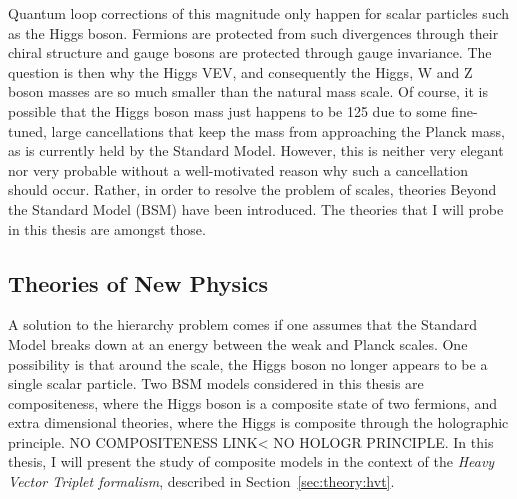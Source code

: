 Quantum loop corrections of this magnitude only happen for scalar particles such as the Higgs boson. Fermions are protected from such divergences through their chiral structure and gauge bosons are protected through gauge invariance. The question is then why the Higgs VEV, and consequently the Higgs, W and Z boson masses are so much smaller than the natural mass scale.\newline
Of course, it is possible that the Higgs boson mass just happens to be 125 \GeV due to some fine-tuned, large cancellations that keep the mass from approaching the Planck mass, as is currently held by the Standard Model. However, this is neither very elegant nor very probable without a well-motivated reason why such a cancellation should occur. Rather, in order to resolve the problem of scales, theories Beyond the Standard Model (BSM) have been introduced. The theories that I will probe in this thesis are amongst those.

\subsection{Theories of New Physics}
A solution to the hierarchy problem comes if one assumes that the Standard Model breaks down at an energy between the weak and Planck scales. One possibility is that around the \TeV scale, the Higgs boson no longer appears to be a single scalar particle. Two BSM models considered in this thesis are compositeness, where the Higgs boson is a composite state of two fermions, and extra dimensional theories, where the Higgs is composite through the holographic principle. NO COMPOSITENESS LINK< NO HOLOGR PRINCIPLE. In this thesis, I will present the study of composite models in the context of the \emph{Heavy Vector Triplet formalism}, described in Section~\ref{sec:theory:hvt}.

